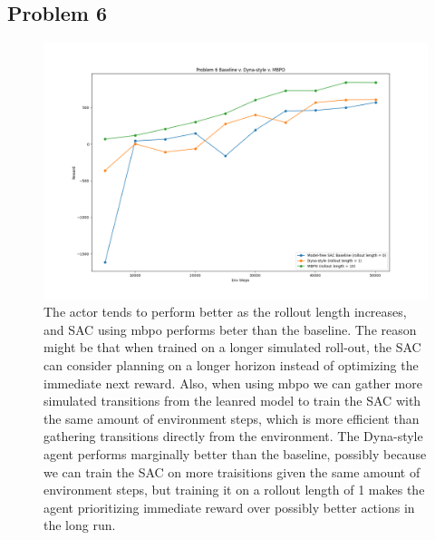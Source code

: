 \documentclass[10pt]{report}
\begin{document}
\newpage
\subsection*{Problem 6}
\begin{figure}[h]
	\includegraphics[width=\textwidth]{figures/Problem 6/Problem 6 mbpo.png}
	\caption{The actor tends to perform better as the rollout length increases, and SAC using mbpo performs beter than the baseline. The reason might be that when trained on a longer simulated roll-out, the SAC can consider planning on a longer horizon instead of optimizing the immediate next reward. Also, when using mbpo we can gather more simulated transitions from the leanred model to train the SAC with the same amount of environment steps, which is more efficient than gathering transitions directly from the environment. The Dyna-style agent performs marginally better than the baseline, possibly because we can train the SAC on more traisitions given the same amount of environment steps, but training it on a rollout length of 1 makes the agent prioritizing immediate reward over possibly better actions in the long run.}
\end{figure}
\end{document}
